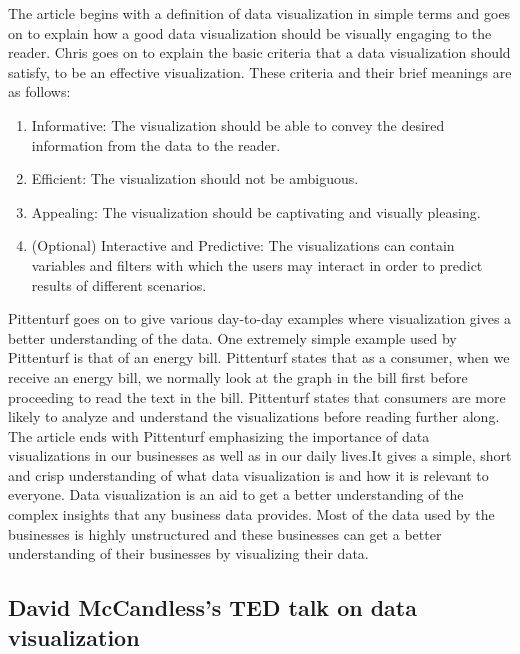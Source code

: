 \documentclass[]{book}
\providecommand{\tightlist}{%
  \setlength{\itemsep}{0pt}\setlength{\parskip}{0pt}}
\theoremstyle{definition}
\theoremstyle{definition}
\theoremstyle{definition}
\theoremstyle{remark}
\begin{document}
The article begins with a definition of data visualization in simple
terms and goes on to explain how a good data visualization should be
visually engaging to the reader. Chris goes on to explain the basic
criteria that a data visualization should satisfy, to be an effective
visualization. These criteria and their brief meanings are as follows:

\begin{enumerate}
\def\labelenumi{\arabic{enumi}.}
\tightlist
\item
  Informative: The visualization should be able to convey the desired
  information from the data to the reader.
\item
  Efficient: The visualization should not be ambiguous.
\item
  Appealing: The visualization should be captivating and visually
  pleasing.
\item
  (Optional) Interactive and Predictive: The visualizations can contain
  variables and filters with which the users may interact in order to
  predict results of different scenarios.
\end{enumerate}

Pittenturf goes on to give various day-to-day examples where
visualization gives a better understanding of the data. One extremely
simple example used by Pittenturf is that of an energy bill. Pittenturf
states that as a consumer, when we receive an energy bill, we normally
look at the graph in the bill first before proceeding to read the text
in the bill. Pittenturf states that consumers are more likely to analyze
and understand the visualizations before reading further along. The
article ends with Pittenturf emphasizing the importance of data
visualizations in our businesses as well as in our daily lives.It gives
a simple, short and crisp understanding of what data visualization is
and how it is relevant to everyone. Data visualization is an aid to get
a better understanding of the complex insights that any business data
provides. Most of the data used by the businesses is highly unstructured
and these businesses can get a better understanding of their businesses
by visualizing their data.

\subsection{David McCandless's TED talk on data
visualization}\label{david-mccandlesss-ted-talk-on-data-visualization}
\end{document}
